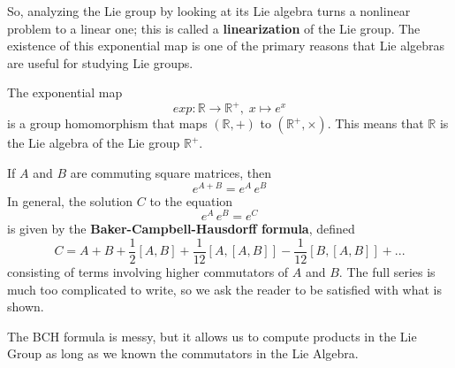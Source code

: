 \documentclass{article}
\begin{document}
    \begin{center}
    \end{center}
    So, analyzing the Lie group by looking at its Lie algebra turns a nonlinear problem to a linear one; this is called a \textbf{linearization} of the Lie group. The existence of this exponential map is one of the primary reasons that Lie algebras are useful for studying Lie groups. 

    \begin{example}
      The exponential map 
      \begin{equation}
        exp: \mathbb{R} \longrightarrow \mathbb{R}^+, \; x \mapsto e^x
      \end{equation}
      is a group homomorphism that maps $(\mathbb{R}, +)$ to $(\mathbb{R}^+, \times)$. This means that $\mathbb{R}$ is the Lie algebra of the Lie group $\mathbb{R}^+$. 
    \end{example}

    \begin{theorem}
      If $A$ and $B$ are commuting square matrices, then 
      \begin{equation}
        e^{A + B} = e^A \, e^B
      \end{equation}
      In general, the solution $C$ to the equation
      \begin{equation}
        e^{A} \, e^B = e^C
      \end{equation}
      is given by the \textbf{Baker-Campbell-Hausdorff formula}, defined
      \begin{equation}
        C = A + B + \frac{1}{2}[A,B] + \frac{1}{12} [A,[A,B]] - \frac{1}{12} [B,[A,B]] + ...
      \end{equation}
      consisting of terms involving higher commutators of $A$ and $B$. The full series is much too complicated to write, so we ask the reader to be satisfied with what is shown. 
    \end{theorem}

    The BCH formula is messy, but it allows us to compute products in the Lie Group as long as we known the commutators in the Lie Algebra. 
\end{document}
